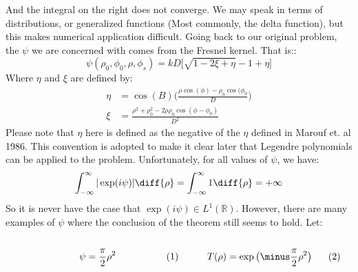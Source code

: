             And the integral on the right does not converge. We may
            speak in terms of distributions, or generalized
            functions (Most commonly, the delta function), but this
            makes numerical application difficult. Going back to
            our original problem, the $\psi$ we are concerned with
            comes from the Fresnel kernel. That is::
            \begin{equation}
                \psi(\rho_{0},\phi_{0},\rho,\phi_{s})
                =kD\Big[\sqrt{1-2\xi+\eta}-1+\eta\Big]
            \end{equation}
            Where $\eta$ and $\xi$ are defined by:
            \begin{subequations}
                \begin{align}
                    \eta&=\cos(B)\Big(
                    \frac{\rho\cos(\phi)-\rho_{0}\cos(\phi_{0}}{D}
                    \Big)\\
                    \xi&=\frac{\rho^{2}+\rho_{0}^{2}-2\rho\rho_{0}
                               \cos(\phi-\phi_{0})}{D^{2}}
                \end{align}
            \end{subequations}
            Please note that $\eta$ here is defined as the negative
            of the $\eta$ defined in Marouf et. al 1986. This
            convention is adopted to make it clear later that
            Legendre polynomials can be applied to the problem.
            Unfortunately, for all values of $\psi$, we have:
            \begin{equation}
                \int_{-\infty}^{\infty}|\exp(i\psi)|\diff{\rho}
                =\int_{-\infty}^{\infty}1\diff{\rho}=+\infty
            \end{equation}
            So it is never have the case that
            $\exp(i\psi)\in L^{1}(\mathbb{R})$. However, there are
            many examples of $\psi$ where the conclusion of the
            theorem still seems to hold. Let:
            \par
            \begin{subequations}
                \begin{minipage}[b]{0.49\textwidth}
                    \centering
                    \begin{equation}
                        \psi=\frac{\pi}{2}\rho^{2}
                    \end{equation}
                \end{minipage}
                \hfill
                \begin{minipage}[b]{0.49\textwidth}
                    \centering
                    \begin{equation}
                        T(\rho)=
                        \exp\big(\minus\frac{\pi}{2}\rho^{2}\big)
                    \end{equation}
                \end{minipage}
            \end{subequations}
